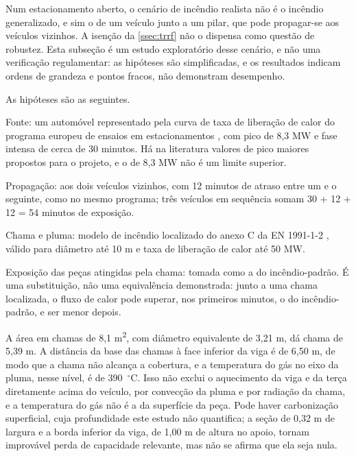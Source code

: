 Num estacionamento aberto, o cenário de incêndio realista não é o incêndio
generalizado, e sim o de um veículo junto a um pilar, que pode propagar-se aos
veículos vizinhos. A isenção da \autoref{ssec:trrf} não o dispensa como questão
de robustez. Esta subseção é um estudo exploratório desse cenário, e não uma
verificação regulamentar: as hipóteses são simplificadas, e os resultados indicam
ordens de grandeza e pontos fracos, não demonstram desempenho.

As hipóteses são as seguintes.

\begin{alineas}
    \item Fonte: um automóvel representado pela curva de taxa de liberação de calor
          do programa europeu de ensaios em estacionamentos \cite{Joyeux:2002},
          com pico de 8,3 MW e fase intensa de cerca de 30 minutos. Há na literatura
          valores de pico maiores propostos para o projeto, e o de 8,3 MW não é um
          limite superior.
    \item Propagação: aos dois veículos vizinhos, com 12 minutos de atraso entre
          um e o seguinte, como no mesmo programa; três veículos em sequência
          somam 30 + 12 + 12 = 54 minutos de exposição.
    \item Chama e pluma: modelo de incêndio localizado do anexo C da EN 1991-1-2
          \cite{EN1991-1-2:2002}, válido para diâmetro até 10 m e taxa de liberação
          de calor até 50 MW.
    \item Exposição das peças atingidas pela chama: tomada como a do
          incêndio-padrão. É uma substituição, não uma equivalência demonstrada:
          junto a uma chama localizada, o fluxo de calor pode superar, nos primeiros
          minutos, o do incêndio-padrão, e ser menor depois.
\end{alineas}

A área em chamas de 8,1 m\textsuperscript{2}, com diâmetro equivalente de
3,21 m, dá chama de 5,39 m. A distância da base das chamas à face inferior da viga
é de 6,50 m, de modo que a chama não alcança a cobertura, e a temperatura do gás
no eixo da pluma, nesse nível, é de 390~$^{\circ}$C. Isso não exclui o
aquecimento da viga e da terça diretamente acima do veículo, por convecção da
pluma e por radiação da chama, e a temperatura do gás não é a da superfície da
peça. Pode haver carbonização superficial, cuja profundidade este estudo não
quantifica; a seção de 0,32 m de largura e a borda inferior da viga, de 1,00 m de
altura no apoio, tornam improvável perda de capacidade relevante, mas não se
afirma que ela seja nula.

